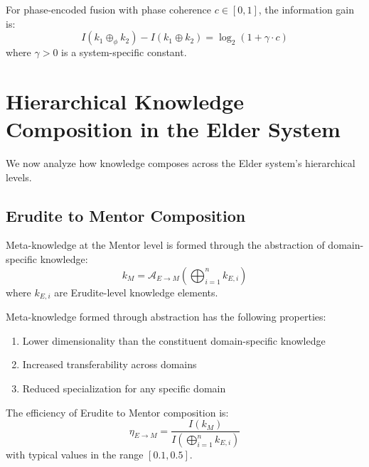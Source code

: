 \begin{theorem}
For phase-encoded fusion with phase coherence $c \in [0, 1]$, the information gain is:
\begin{equation}
I(k_1 \oplus_\phi k_2) - I(k_1 \oplus k_2) = \log_2(1 + \gamma \cdot c)
\end{equation}
where $\gamma > 0$ is a system-specific constant.
\end{theorem}

\section{Hierarchical Knowledge Composition in the Elder System}



We now analyze how knowledge composes across the Elder system's hierarchical levels.

\subsection{Erudite to Mentor Composition}

\begin{definition}
Meta-knowledge at the Mentor level is formed through the abstraction of domain-specific knowledge:
\begin{equation}
k_M = \mathcal{A}_{E \rightarrow M}\left(\bigoplus_{i=1}^{n} k_{E,i}\right)
\end{equation}
where $k_{E,i}$ are Erudite-level knowledge elements.
\end{definition}

\begin{theorem}
Meta-knowledge formed through abstraction has the following properties:
\begin{enumerate}
    \item Lower dimensionality than the constituent domain-specific knowledge
    \item Increased transferability across domains
    \item Reduced specialization for any specific domain
\end{enumerate}
\end{theorem}

\begin{theorem}
The efficiency of Erudite to Mentor composition is:
\begin{equation}
\eta_{E \rightarrow M} = \frac{I(k_M)}{I\left(\bigoplus_{i=1}^{n} k_{E,i}\right)}
\end{equation}
with typical values in the range $[0.1, 0.5]$.
\end{theorem}

